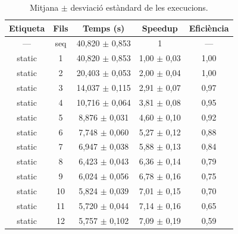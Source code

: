 \begin{table}[H]
\centering
\begin{tabular}{|c|c|c|c|c|}
\hline
\textbf{Etiqueta} & \textbf{Fils} & \textbf{Temps (s)} & \textbf{Speedup} & \textbf{Eficiència} \\ \hline
--- & seq & 40,820 $\pm$ 0,853 & 1 & --- \\ \hline
static & 1 & 40,820 $\pm$ 0,853 & 1,00 $\pm$ 0,03 & 1,00 \\ \hline
static & 2 & 20,403 $\pm$ 0,053 & 2,00 $\pm$ 0,04 & 1,00 \\ \hline
static & 3 & 14,037 $\pm$ 0,115 & 2,91 $\pm$ 0,07 & 0,97 \\ \hline
static & 4 & 10,716 $\pm$ 0,064 & 3,81 $\pm$ 0,08 & 0,95 \\ \hline
static & 5 & 8,876 $\pm$ 0,031 & 4,60 $\pm$ 0,10 & 0,92 \\ \hline
static & 6 & 7,748 $\pm$ 0,060 & 5,27 $\pm$ 0,12 & 0,88 \\ \hline
static & 7 & 6,947 $\pm$ 0,038 & 5,88 $\pm$ 0,13 & 0,84 \\ \hline
static & 8 & 6,423 $\pm$ 0,043 & 6,36 $\pm$ 0,14 & 0,79 \\ \hline
static & 9 & 6,024 $\pm$ 0,056 & 6,78 $\pm$ 0,16 & 0,75 \\ \hline
static & 10 & 5,824 $\pm$ 0,039 & 7,01 $\pm$ 0,15 & 0,70 \\ \hline
static & 11 & 5,720 $\pm$ 0,044 & 7,14 $\pm$ 0,16 & 0,65 \\ \hline
static & 12 & 5,757 $\pm$ 0,102 & 7,09 $\pm$ 0,19 & 0,59 \\ \hline
\end{tabular}
\caption{Mitjana $\pm$ desviació estàndard de les execucions.}
\label{tab:resultats}
\end{table}
